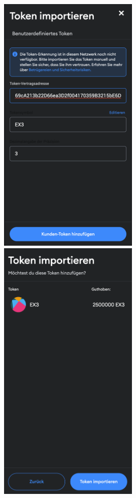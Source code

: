 \documentclass[14pt,a4paper]{extarticle}
\begin{document}
	\includegraphics[width=0.5\textwidth]{images/metamask_add_token.png} 
	\includegraphics[width=0.5\textwidth]{images/metamask_millionair.png}
\end{document}
